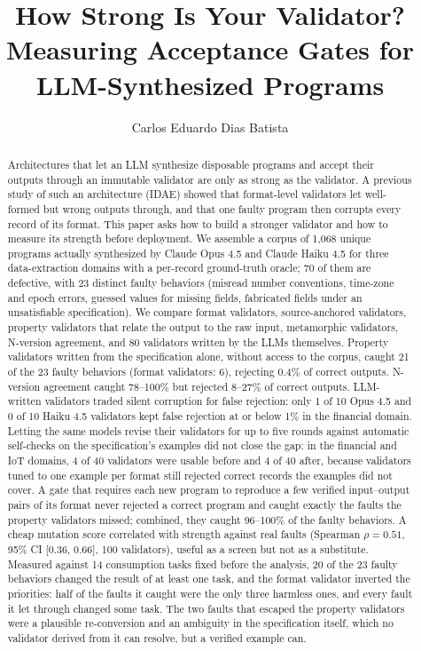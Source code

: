 \documentclass[sigconf,nonacm]{acmart}
\begin{document}
\title[How Strong Is Your Validator?]{How Strong Is Your Validator? Measuring Acceptance Gates for LLM-Synthesized Programs}

\author{Carlos Eduardo Dias Batista}

\renewcommand{\shortauthors}{Batista}

\begin{abstract}
Architectures that let an LLM synthesize disposable programs and accept their outputs through an immutable validator are only as strong as the validator. A previous study of such an architecture (IDAE) showed that format-level validators let well-formed but wrong outputs through, and that one faulty program then corrupts every record of its format. This paper asks how to build a stronger validator and how to measure its strength before deployment. We assemble a corpus of 1{,}068 unique programs actually synthesized by Claude Opus 4.5 and Claude Haiku 4.5 for three data-extraction domains with a per-record ground-truth oracle; 70 of them are defective, with 23 distinct faulty behaviors (misread number conventions, time-zone and epoch errors, guessed values for missing fields, fabricated fields under an unsatisfiable specification). We compare format validators, source-anchored validators, property validators that relate the output to the raw input, metamorphic validators, N-version agreement, and 80 validators written by the LLMs themselves. Property validators written from the specification alone, without access to the corpus, caught 21 of the 23 faulty behaviors (format validators: 6), rejecting 0.4\% of correct outputs. N-version agreement caught 78--100\% but rejected 8--27\% of correct outputs. LLM-written validators traded silent corruption for false rejection: only 1 of 10 Opus 4.5 and 0 of 10 Haiku 4.5 validators kept false rejection at or below 1\% in the financial domain. Letting the same models revise their validators for up to five rounds against automatic self-checks on the specification's examples did not close the gap: in the financial and IoT domains, 4 of 40 validators were usable before and 4 of 40 after, because validators tuned to one example per format still rejected correct records the examples did not cover. A gate that requires each new program to reproduce a few verified input--output pairs of its format never rejected a correct program and caught exactly the faults the property validators missed; combined, they caught 96--100\% of the faulty behaviors. A cheap mutation score correlated with strength against real faults (Spearman $\rho = 0.51$, 95\% CI [0.36, 0.66], 100 validators), useful as a screen but not as a substitute. Measured against 14 consumption tasks fixed before the analysis, 20 of the 23 faulty behaviors changed the result of at least one task, and the format validator inverted the priorities: half of the faults it caught were the only three harmless ones, and every fault it let through changed some task. The two faults that escaped the property validators were a plausible re-conversion and an ambiguity in the specification itself, which no validator derived from it can resolve, but a verified example can.
\end{abstract}
\end{document}
